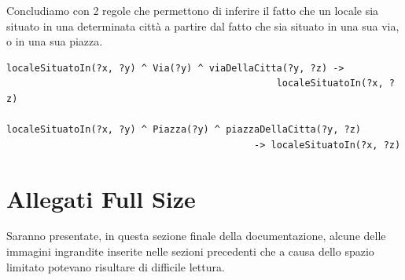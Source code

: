 \documentclass[12pt]{article}
\begin{document}
\newpage
Concludiamo con 2 regole che permettono di inferire il fatto che un locale sia situato in una determinata città a partire dal fatto che sia situato in una sua via, o in una sua piazza.
\begin{lstlisting}[language=SPARQL]
localeSituatoIn(?x, ?y) ^ Via(?y) ^ viaDellaCitta(?y, ?z) ->
                                                localeSituatoIn(?x, ?z)
    
localeSituatoIn(?x, ?y) ^ Piazza(?y) ^ piazzaDellaCitta(?y, ?z)
                                            -> localeSituatoIn(?x, ?z)
\end{lstlisting}
\section{Allegati Full Size}
Saranno presentate, in questa sezione finale della documentazione, alcune delle immagini ingrandite inserite nelle sezioni precedenti che a causa dello spazio limitato potevano risultare di difficile lettura.
\end{document}

